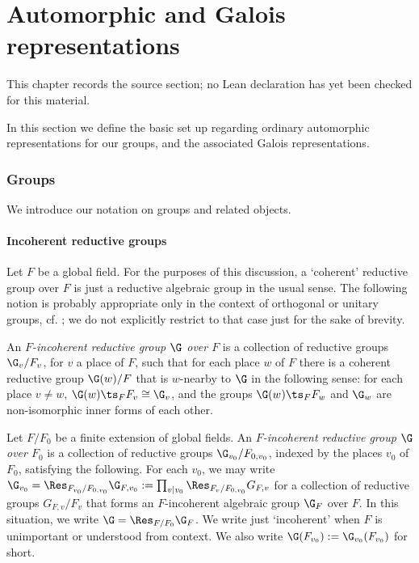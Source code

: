 \chapter{Automorphic and Galois representations}
\label{universal-p-adic-gross-zagier-formula-chapter-02}

\begin{remark}
\label{universal-p-adic-gross-zagier-formula-chapter-02-source}
This chapter records the source section; no Lean declaration has yet been checked for this material.
\notready
\end{remark}

In this section we define the basic set up regarding  ordinary automorphic representations for our groups, and the associated Galois representations.

\subsection{Groups}\label{sec: not} We introduce our notation on groups and related objects.

\subsubsection{Incoherent reductive groups} 
Let $F$ be a global field. For the purposes of this discussion, a `coherent' reductive  group over $F$ is just a reductive  algebraic group in the usual sense. The following notion is probably appropriate only in the context of orthogonal or unitary groups, cf. \cite{gross-incoh}; we do not explicitly restrict to that case just for the sake of brevity.

 An \emph{$F$-incoherent reductive group $\G$ over $F$} is a collection of reductive  groups $\G_{v}/F_{v}$, for $v$ a place of $F$, such that for each place $w$ of $F$ there is a coherent reductive  group $\G(w)/F$ that is $w$-nearby to $\G$ in the following sense: for each place $v\neq w$, $\G(w)\ts_{F}F_{v}\cong \G_{v}$, and the groups $\G(w_{})\ts_{F}F_{w}$ and  $\G_{w} $ are non-isomorphic inner forms of each other.

 Let $F/F_{0}$ be a finite extension of global fields. An \emph{$F$-incoherent reductive  group $\G$ over $F_{0}$} is a collection of reductive groups $\G_{v_{0}}/F_{0, v_{0}}$, indexed by the places $v_{0}$ of $F_{0}$, satisfying the following. For each $v_{0}$, we may write $\G_{v_{0}}=\Res_{F_{v_{0}}/F_{0,v_{0}}}\G_{F, v_{0}}:=\prod_{v\vert v_{0}}\Res_{F_{v}/F_{0, v_{0}}} G_{F, v}$ for a collection of reductive groups $G_{F, v}/F_{v}$ that forms an $F$-incoherent algebraic group $\G_{F}$ over $F$.
In this  situation, we write $\G=\Res_{F/{F_{0}}} \G_{F}$. We write just `incoherent' when $F$ is unimportant or understood from context. We also write $\G(F_{v_{0}}):= \G_{v_{0}}(F_{v_{0}})$ for short.

